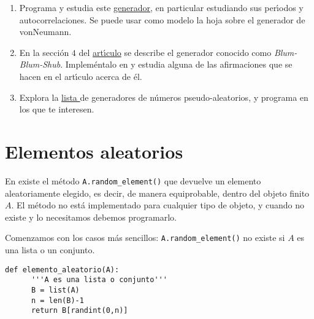 \begin{ejer}
 
 \begin{enumerate}
  \item Programa y estudia este 
  \href{http://en.wikipedia.org/wiki/Linear_congruential_generator}{generador},
en particular estudiando sus per\'{\i}odos y autocorrelaciones.  Se puede usar
como modelo la hoja sobre el generador de vonNeumann.


  \item En la secci\'on $4$ del \href{run:PDFs/PROBA/bbs.pdf}{art\'{\i}culo} se
describe el generador conocido como {\itshape Blum-Blum-Shub}. Implem\'entalo en
{\sage} y estudia alguna de las afirmaciones que se hacen en el art\'{\i}culo
acerca de \'el.
  

 \item Explora la
\href{http://en.wikipedia.org/wiki/List_of_pseudorandom_number_generators}{lista
} de generadores de n\'umeros pseudo-aleatorios,   y programa en {\sage} los que
te interesen. 


  
 \end{enumerate}
 \end{ejer}
\section{Elementos aleatorios}
 
 
 En {\sage} existe el m\'etodo \lstinline|A.random_element()| que devuelve un 
elemento aleatoriamente elegido, es decir, de manera equiprobable, dentro del 
objeto finito $A$. El m\'etodo no est\'a implementado para cualquier tipo de 
objeto, y cuando no existe y lo necesitamos debemos programarlo. 
 
 
 Comenzamos con los casos m\'as sencillos: \lstinline|A.random_element()| no 
existe si $A$ es una lista o un conjunto.
 
 \begin{lstlisting}
def elemento_aleatorio(A):
      '''A es una lista o conjunto'''
      B = list(A)
      n = len(B)-1
      return B[randint(0,n)]
\end{lstlisting}

 
